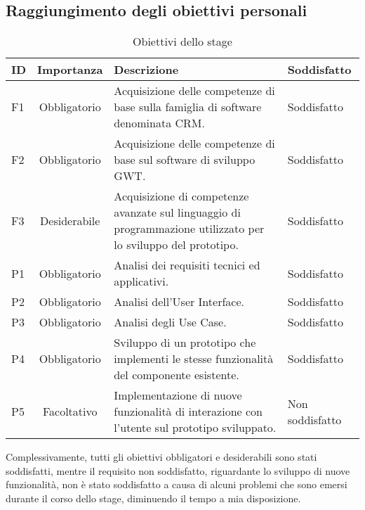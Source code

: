 \subsection{Raggiungimento degli obiettivi personali}
\begin{table}[h]
	\centering
	\caption{Obiettivi dello stage}
	\label{tab:obiettivi-raggiunti}
	\begin{tabular}{|l|c|p{7cm}|p{4cm}|}
		\hline
		\rule[-4mm]{0mm}{1cm}
		ID & Importanza & Descrizione & Soddisfatto\\
		\hline
		\rule[-3mm]{0mm}{0.8cm}
		F1 & Obbligatorio & Acquisizione delle competenze di base sulla famiglia di software denominata CRM. & Soddisfatto\\
		\hline
		\rule[-3mm]{0mm}{0.8cm}
		F2 & Obbligatorio & Acquisizione delle competenze di base sul software di sviluppo GWT. & Soddisfatto\\
		\hline
		\rule[-3mm]{0mm}{0.8cm}
		F3 & Desiderabile & Acquisizione di competenze avanzate sul linguaggio di programmazione utilizzato per lo sviluppo del prototipo. & Soddisfatto\\
		\hline
		\rule[-3mm]{0mm}{0.8cm}
		P1 & Obbligatorio & Analisi dei requisiti tecnici ed applicativi. & Soddisfatto\\
		\hline
		\rule[-3mm]{0mm}{0.8cm}
		P2 & Obbligatorio & Analisi dell'User Interface. & Soddisfatto\\
		\hline
		\rule[-3mm]{0mm}{0.8cm}
		P3 & Obbligatorio & Analisi degli Use Case. & Soddisfatto\\
		\hline
		\rule[-3mm]{0mm}{0.8cm}
		P4 & Obbligatorio & Sviluppo di un prototipo che implementi le stesse funzionalità del componente esistente. & Soddisfatto\\
		\hline
		\rule[-3mm]{0mm}{0.8cm}
		P5 & Facoltativo & Implementazione di nuove funzionalità di interazione con l'utente sul prototipo sviluppato. & Non soddisfatto\\
		\hline
	\end{tabular}
\end{table}
Complessivamente, tutti gli obiettivi obbligatori e desiderabili sono stati soddisfatti, mentre il requisito non soddisfatto, riguardante lo sviluppo di nuove funzionalità, non è stato soddisfatto a causa di alcuni problemi che sono emersi durante il corso dello stage, diminuendo il tempo a mia disposizione.\\

